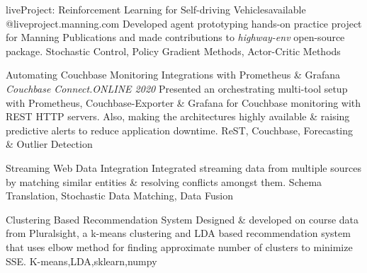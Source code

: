 
\begin{projects}

 
    \project
	{liveProject: Reinforcement Learning for Self-driving Vehicles}{available @liveproject.manning.com}
	{}
	{Developed agent prototyping hands-on practice project for Manning Publications and made contributions to \textit{highway-env} open-source package.}
	{Stochastic Control, Policy Gradient Methods, Actor-Critic Methods}

    \project
	{Automating Couchbase Monitoring Integrations with Prometheus \& Grafana}{ \textit{Couchbase Connect.ONLINE 2020} }
	{
	}
	{Presented an orchestrating multi-tool setup with Prometheus, Couchbase-Exporter \& Grafana for Couchbase monitoring with REST HTTP servers. Also, making the architectures highly available \& raising predictive alerts to reduce application downtime.}
	{ReST, Couchbase, Forecasting \& Outlier Detection}

    \iffalse
	\project
	{Streaming Web Data Integration}{}
	{}
	{Integrated streaming data from multiple sources by matching similar entities \& resolving conflicts amongst them.}
	{Schema Translation, Stochastic Data Matching, Data Fusion}
	
 
	\project
	{Clustering Based Recommendation System}{}
	{   }
	{Designed \& developed on course data from Pluralsight, a k-means clustering and LDA based recommendation system that uses elbow method for finding approximate number of clusters to minimize SSE.}
	{K-means,LDA,sklearn,numpy}
    

\end{projects}
